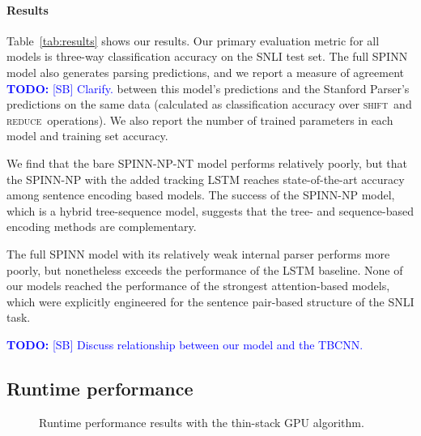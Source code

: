 \documentclass[11pt]{article}
\newcommand\todo[1]{\textcolor{blue}{\textbf{TODO:} #1}}
\newcommand{\shift}{\textsc{shift}}
\newcommand{\reduce}{\textsc{reduce}}
\begin{document}
\paragraph{Results} Table~\ref{tab:results} shows our results. Our primary evaluation metric for all models is three-way classification accuracy on the SNLI test set. The full SPINN model also generates parsing predictions, and we report a measure of agreement \todo{[SB] Clarify.} between this model's predictions and the Stanford Parser's predictions on the same data (calculated as classification accuracy over \shift~and \reduce~operations). We also report the number of trained parameters in each model and training set accuracy.

We find that the bare SPINN-NP-NT model performs relatively poorly, but that the SPINN-NP with the added tracking LSTM reaches state-of-the-art accuracy among sentence encoding based models. The success of the SPINN-NP model, which is a hybrid tree-sequence model, suggests that the tree- and sequence-based encoding methods are complementary.

The full SPINN model with its relatively weak internal parser performs more poorly, but nonetheless exceeds the performance of the LSTM baseline. None of our models reached the performance of the strongest attention-based models, which were explicitly engineered for the sentence pair-based structure of the SNLI task.

\todo{[SB] Discuss relationship between our model and the TBCNN.}

\subsection{Runtime performance}
\label{sec:speed}

\begin{figure}
\caption{Runtime performance results with the thin-stack GPU algorithm.}
\label{fig:speed}
\end{figure}
\end{document}

